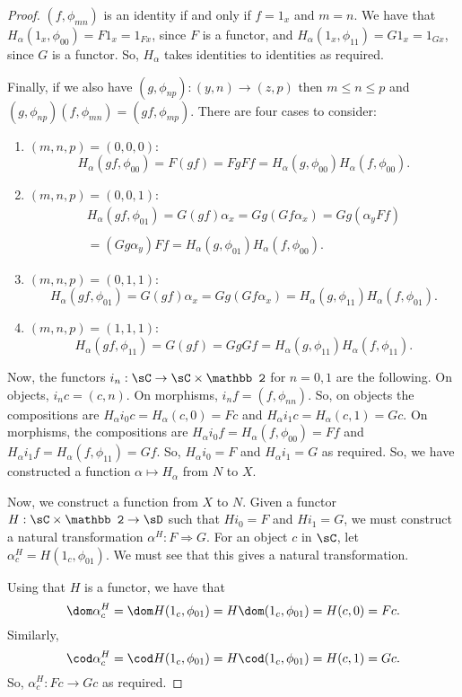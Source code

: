 \documentclass[../../main]{subfiles}
\begin{document}
\begin{proof}
	$(f,\phi_{mn})$ is an identity if and only if $f=1_x$ and $m=n$. We have
	that $H_\alpha(1_x,\phi_{00})=F1_x=1_{Fx}$, since $F$ is a functor, and
	$H_\alpha(1_x,\phi_{11})=G1_x=1_{Gx}$, since $G$ is a functor. So,
	$H_\alpha$ takes identities to identities as required.

	Finally, if we also have $(g,\phi_{np}):(y,n)\rightarrow (z,p)$ then $m\le
	n\le p$ and $(g,\phi_{np})(f,\phi_{mn})=(gf,\phi_{mp})$. There are four
	cases to consider:
	\begin{enumerate}
		\item $(m,n,p)=(0,0,0)$:
			\[H_\alpha(gf,\phi_{00})=F(gf)=FgFf=H_\alpha(g,\phi_{00})H_\alpha(f,\phi_{00}).\]
		\item $(m,n,p)=(0,0,1)$:
			\[\begin{array}{l}H_\alpha(gf,\phi_{01})=G(gf)\alpha_x=Gg(Gf\alpha_x)=Gg(\alpha_yFf)\\ \\
					=(Gg\alpha_y)Ff=H_\alpha(g,\phi_{01})H_\alpha(f,\phi_{00}).
			\end{array}\]
		\item $(m,n,p)=(0,1,1)$:
			\[H_\alpha(gf,\phi_{01})=G(gf)\alpha_x=Gg(Gf\alpha_x)=H_\alpha(g,\phi_{11})H_\alpha(f,\phi_{01}).\]
		\item $(m,n,p)=(1,1,1)$:
			\[H_\alpha(gf,\phi_{11})=G(gf)=GgGf=H_\alpha(g,\phi_{11})H_\alpha(f,\phi_{11}).\]
	\end{enumerate}

	Now, the functors $i_n:\sC\rightarrow\sC\times\mathbb 2$ for $n=0,1$ are the
	following. On objects, $i_nc=(c,n)$. On morphisms, $i_nf=(f,\phi_{nn})$. So,
	on objects the compositions are $H_\alpha i_0c=H_\alpha (c,0)=Fc$ and
	$H_\alpha i_1c=H_\alpha (c,1)=Gc$. On morphisms, the compositions are
	$H_\alpha i_0f=H_\alpha (f,\phi_{00})=Ff$ and $H_\alpha i_1f=H_\alpha
	(f,\phi_{11})=Gf$. So, $H_\alpha i_0=F$ and $H_\alpha i_1=G$ as required.
	So, we have constructed a function $\alpha\mapsto H_\alpha$ from $N$ to $X$.

	Now, we construct a function from $X$ to $N$. Given a functor
	$H:\sC\times\mathbb 2\rightarrow\sD$ such that $Hi_0=F$ and $Hi_1=G$, we
	must construct a natural transformation $\alpha^H:F\Rightarrow G$. For an
	object $c$ in $\sC$, let $\alpha^H_c=H(1_c,\phi_{01})$. We must see that
	this gives a natural transformation.

	Using that $H$ is a functor, we have that
	\[\dom\alpha^H_c=\dom H(1_c,\phi_{01})=H\dom(1_c,\phi_{01})=H(c,0)=Fc.\]
	Similarly,
	\[\cod\alpha^H_c=\cod H(1_c,\phi_{01})=H\cod(1_c,\phi_{01})=H(c,1)=Gc.\]
	So, $\alpha^H_c:Fc\rightarrow Gc$ as required.


\end{proof}
\end{document}
